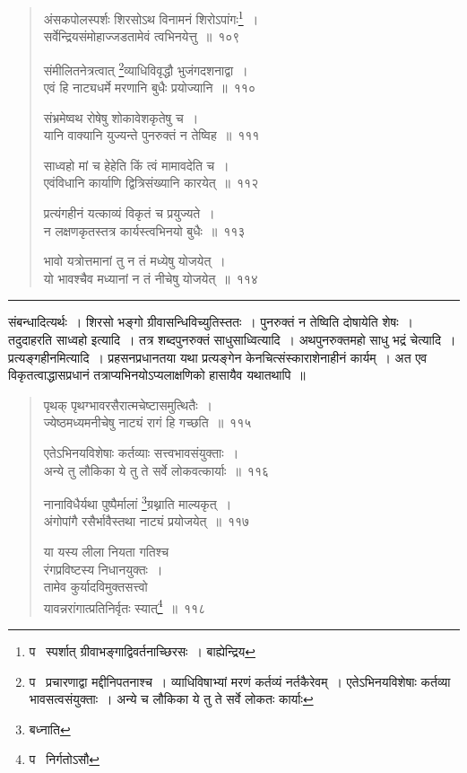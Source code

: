 \documentclass[11pt, openany]{book}
\begin{document}
\begin{quote}
{\na अंसकपोलस्पर्शः शिरसोऽथ विनामनं शिरोऽपांगः\renewcommand{\thefootnote}{1}\footnote{प \textendash\  स्पर्शात् ग्रीवाभङ्गाद्विवर्तनाच्छिरसः~। बाह्येन्द्रिय}~।\\
सर्वेन्द्रियसंमोहाज्जडतामेवं त्वभिनयेत्तु~॥~१०९

संमीलितनेत्रत्वात् \renewcommand{\thefootnote}{2}\footnote{प \textendash\  प्रचारणाद्वा मद्दीनिपतनाश्च~। व्याधिविषाभ्यां मरणं कर्तव्यं नर्तकैरेवम्~। एतेऽभिनयविशेषाः कर्तव्या भावसत्वसंयुक्ताः~। अन्ये च लौकिका ये तु ते सर्वे लोकतः कार्याः}व्याधिविवृद्धौ भुजंगदशनाद्वा~।\\
एवं हि नाट्यधर्मे मरणानि बुधैः प्रयोज्यानि~॥~११०

संभ्रमेष्वथ रोषेषु शोकावेशकृतेषु च~।\\
यानि वाक्यानि युज्यन्ते पुनरुक्तं न तेष्विह~॥~१११

साध्वहो मां च हेहेति किं त्वं मामावदेति च~।\\
एवंविधानि कार्याणि द्वित्रिसंख्यानि कारयेत्~॥~११२

प्रत्यंगहीनं यत्काव्यं विकृतं च प्रयुज्यते~।\\
न लक्षणकृतस्तत्र कार्यस्त्वभिनयो बुधैः~॥~११३

भावो यत्रोत्तमानां तु न तं मध्येषु योजयेत्~।\\
यो भावश्चैव मध्यानां न तं नीचेषु योजयेत्~॥~११४}
\end{quote}

\hrule

\vspace{2mm}
\noindent
संबन्धादित्यर्थः~। शिरसो भङ्गो ग्रीवासन्धिविच्युतिस्ततः~। पुनरुक्तं न तेष्विति दोषायेति शेषः~। तदुदाहरति साध्वहो इत्यादि~। तत्र शब्दपुनरुक्तं साधुसाध्वित्यादि~। अथपुनरुक्तमहो साधु भद्रं चेत्यादि~। प्रत्यङ्गहीनमित्यादि~। प्रहसनप्रधानतया यथा प्रत्यङ्गेन केनचित्संस्काराशेनाहीनं कार्यम्~। अत एव विकृतत्वाद्धासप्रधानं तत्राप्यभिनयोऽप्यलाक्षणिको हासायैव यथातथापि~॥

\newpage

\begin{quote}
{\na पृथक् पृथग्भावरसैरात्मचेष्टासमुत्थितैः~।\\
ज्येष्ठमध्यमनीचेषु नाट्यं रागं हि गच्छति~॥~११५

एतेऽभिनयविशेषाः कर्तव्याः सत्त्वभावसंयुक्ताः~।\\
अन्ये तु लौकिका ये तु ते सर्वे लोकवत्कार्याः~॥~११६

नानाविधैर्यथा पुष्पैर्मालां \renewcommand{\thefootnote}{1}\footnote{बध्नाति}ग्रथ्नाति माल्यकृत्~।\\
अंगोपांगै रसैर्भावैस्तथा नाट्यं प्रयोजयेत्~॥~११७

या यस्य लीला नियता गतिश्च\\
रंगप्रविष्टस्य निधानयुक्तः~।\\
तामेव कुर्यादविमुक्तसत्त्वो\\
यावन्नरांगात्प्रतिनिर्वृतः स्यात्\renewcommand{\thefootnote}{2}\footnote{प \textendash\  निर्गतोऽसौ}~॥~११८}
\end{quote}
\end{document}
